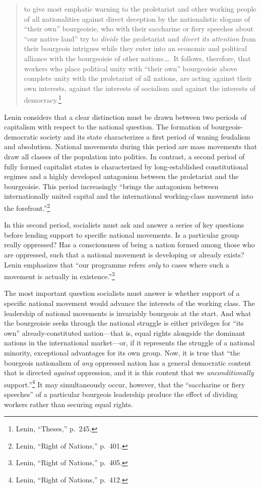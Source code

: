 \blockquote{to give most emphatic warning to the proletariat and other working people of all nationalities against direct deception by the nationalistic slogans of ``their own'' bourgeoisie, who with their saccharine or fiery speeches about ``our native land'' try to \emph{divide} the proletariat and \emph{divert its attention} from their bourgeois intrigues while they enter into an economic and political alliance with the bourgeoisie of other nations.\ldots\ It follows, therefore, that workers who place political unity with ``their own'' bourgeoisie above complete unity with the proletariat of all nations, are acting against their own interests, against the interests of socialism and against the interests of democracy.\footnote{Lenin, ``Theses,'' p.\ 245.}}

Lenin considers that a clear distinction must be drawn between two periods of capitalism with respect to the national question. The formation of bourgeois-democratic society and its state characterizes a first period of waning feudalism and absolutism. National movements during this period are mass movements that draw all classes of the population into politics. In contrast, a second period of fully formed capitalist states is characterized by long-established constitutional regimes and a highly developed antagonism between the proletariat and the bourgeoisie. This period increasingly ``brings the antagonism between internationally united capital and the international working-class movement into the forefront.''\footnote{Lenin, ``Right of Nations,'' p.\ 401.}

In this second period, socialists must ask and answer a series of key questions before lending support to specific national movements. Is a particular group really oppressed? Has a consciousness of being a nation formed among those who are oppressed, such that a national movement is developing or already exists? Lenin emphasizes that ``our programme refers \emph{only} to cases where such a movement is actually in existence.''\footnote{Lenin, ``Right of Nations,'' p.\ 405.}

The most important question socialists must answer is whether support of a specific national movement would advance the interests of the working class. The leadership of national movements is invariably bourgeois at the start. And what the bourgeoisie seeks through the national struggle is either privileges for ``its own'' already-constituted nation---that is, equal rights alongside the dominant nations in the international market---or, if it represents the struggle of a national minority, exceptional advantages for its own group. Now, it is true that ``the bourgeois nationalism of \emph{any} oppressed nation has a general democratic content that is directed \emph{against} oppression, and it is this content that we \emph{unconditionally} support.''\footnote{Lenin, ``Right of Nations,'' p.\ 412.} It may simultaneously occur, however, that the ``saccharine or fiery speeches'' of a particular bourgeois leadership produce the effect of dividing workers rather than securing equal rights.

